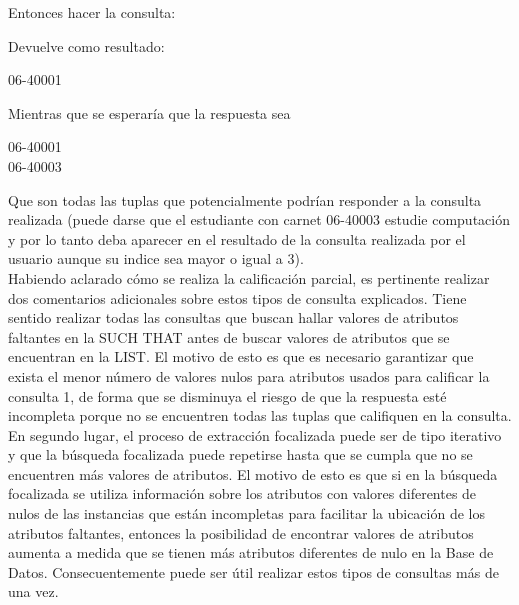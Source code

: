 Entonces hacer la consulta: 

	Devuelve como resultado:

\begin{center}
06-40001\\
\end{center}

	Mientras que se esperaría que la respuesta sea 

\begin{center}	
06-40001\\
06-40003\\
\end{center}


	Que son todas las tuplas que potencialmente podrían responder a la consulta realizada (puede darse que el estudiante con carnet 06-40003 estudie computación y por lo tanto deba aparecer en el resultado de la consulta realizada por el usuario aunque su indice sea mayor o igual a 3). \\

Habiendo aclarado cómo se realiza la calificación parcial, es pertinente realizar dos comentarios adicionales sobre estos tipos de consulta explicados. Tiene sentido realizar todas las consultas que buscan hallar valores de atributos faltantes en la SUCH THAT antes de buscar valores de atributos que se encuentran en la LIST. El motivo de esto es que es necesario garantizar que exista el menor número de valores nulos para atributos usados para calificar la consulta 1, de forma que se disminuya el riesgo de que la respuesta esté incompleta porque no se encuentren todas las tuplas que califiquen en la consulta. \\

	En segundo lugar, el proceso de extracción focalizada puede ser de tipo iterativo y que la búsqueda focalizada puede repetirse hasta que se cumpla que no se encuentren más valores de atributos. El motivo de esto es que si en la búsqueda focalizada se utiliza información sobre los atributos con valores diferentes de nulos de las instancias que están incompletas para facilitar la ubicación de los atributos faltantes, entonces la posibilidad de encontrar valores de atributos aumenta a medida que se tienen más atributos diferentes de nulo en la Base de Datos. Consecuentemente puede ser útil realizar estos tipos de consultas más de una vez. \\

